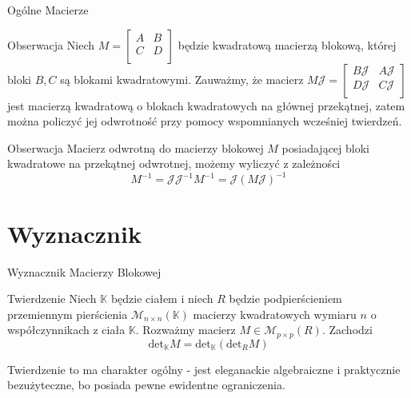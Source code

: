 \documentclass{beamer}
\renewcommand{\det}{\textrm{det}}
\begin{document}
\begin{frame}{Ogólne Macierze}
    \begin{block}{Obserwacja}
        Niech $M = \begin{bmatrix}
            A & B \\ C & D \\
        \end{bmatrix}$ będzie kwadratową macierzą blokową, której bloki $B, C$ są blokami kwadratowymi. 
        Zauważmy, że macierz $M\mathcal{J} = \begin{bmatrix}
            B\mathcal{J} & A\mathcal{J} \\ D\mathcal{J} & C\mathcal{J} \\
        \end{bmatrix}$ jest macierzą kwadratową o blokach kwadratowych na głównej przekątnej, zatem można policzyć jej odwrotność 
        przy pomocy wspomnianych wcześniej twierdzeń. 
    \end{block}
    \begin{block}{Obserwacja}
        Macierz odwrotną do macierzy blokowej $M$ posiadającej bloki kwadratowe na przekątnej odwrotnej, możemy wyliczyć z zależności
        $$M^{-1} = \mathcal{J}\mathcal{J}^{-1} M^{-1} = \mathcal{J} (M\mathcal{J})^{-1}$$
    \end{block}
\end{frame}

\section{Wyznacznik}

\begin{frame}{Wyznacznik Macierzy Blokowej}
    \begin{block}{Twierdzenie}
        Niech $\mathbb{K}$ będzie ciałem i niech $R$ będzie podpierścieniem przemiennym pierścienia $\mathcal{M}_{n \times n}(\mathbb{K})$ macierzy kwadratowych wymiaru $n$ o współczynnikach z ciała $\mathbb{K}$.
        Rozważmy macierz $M \in \mathcal{M}_{p \times p}(R)$. Zachodzi 
        $$ \det_{\mathbb{K}}M = \det _{\mathbb{K}}(\det_R M)$$ 
    \end{block}
    \pause 
    Twierdzenie to ma charakter ogólny 
    - jest eleganackie algebraiczne i praktycznie bezużyteczne, bo posiada pewne ewidentne ograniczenia.

\end{frame}
\end{document}
